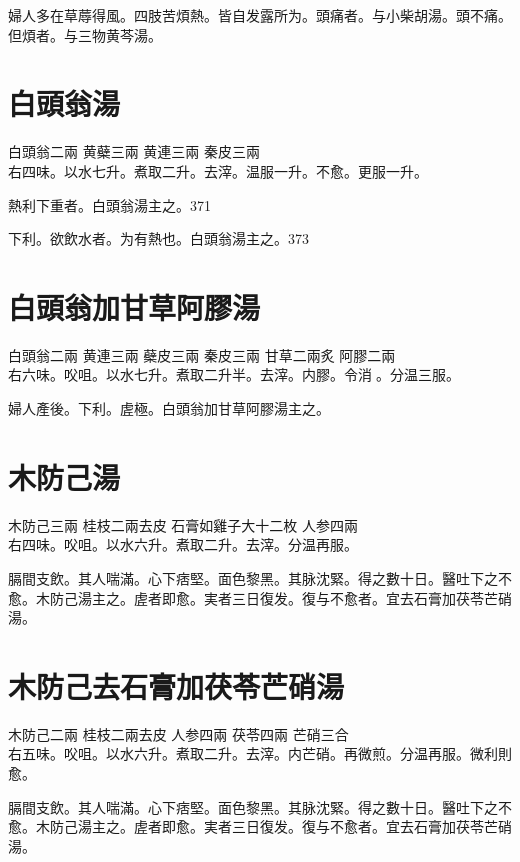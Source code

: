 婦人多在草蓐得風。四肢苦煩熱。皆自发露所为。頭痛者。与小柴胡湯。頭不痛。但煩者。与三物黄芩湯。

\section{白頭翁湯}

白頭翁{\scriptsize 二兩} 黄蘗{\scriptsize 三兩} 黄連{\scriptsize 三兩} 秦皮{\scriptsize 三兩}\\
右四味。以水七升。煮取二升。去滓。温服一升。不愈。更服一升。

熱利下重者。白頭翁湯主之。371

下利。欲飲水者。为有熱也。白頭翁湯主之。373

\section{白頭翁加甘草阿膠湯}

白頭翁{\scriptsize 二兩} 黄連{\scriptsize 三兩} 蘗皮{\scriptsize 三兩} 秦皮{\scriptsize 三兩} 甘草{\scriptsize 二兩炙} 阿膠{\scriptsize 二兩}\\
右六味。㕮咀。以水七升。煮取二升半。去滓。内膠。令消{\sungii 𥁞}。分温三服。

婦人產後。下利。虗極。白頭翁加甘草阿膠湯主之。

\section{木防己湯}

木防己{\scriptsize 三兩} 桂枝{\scriptsize 二兩去皮} 石膏{\scriptsize 如雞子大十二枚} 人参{\scriptsize 四兩}\\
右四味。㕮咀。以水六升。煮取二升。去滓。分温再服。

膈間支飲。其人喘滿。心下痞堅。面色黎黑。其脉沈緊。得之數十日。醫吐下之不愈。木防己湯主之。虗者即愈。実者三日復发。復与不愈者。宜去石膏加茯苓芒硝湯。

\section{木防己去石膏加茯苓芒硝湯}

木防己{\scriptsize 二兩} 桂枝{\scriptsize 二兩去皮} 人参{\scriptsize 四兩} 茯苓{\scriptsize 四兩} 芒硝{\scriptsize 三合}\\
右五味。㕮咀。以水六升。煮取二升。去滓。内芒硝。再微煎。分温再服。微利則愈。

膈間支飲。其人喘滿。心下痞堅。面色黎黑。其脉沈緊。得之數十日。醫吐下之不愈。木防己湯主之。虗者即愈。実者三日復发。復与不愈者。宜去石膏加茯苓芒硝湯。

